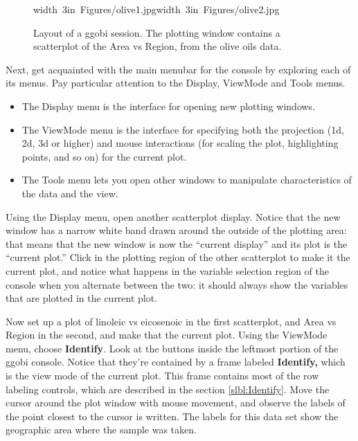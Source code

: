 \documentclass[11pt]{article}
\begin{document}
\begin{figure}[h]
\hbox{\pdfimage width 3in {Figures/olive1.jpg}\pdfimage width 3in {Figures/olive2.jpg}}
\caption{Layout of a ggobi session.  The plotting window contains a
scatterplot of the Area vs Region, from the olive oils data.
}%
\label{fig1}
\end{figure}

Next, get acquainted with the main menubar for the console by
exploring each of its menus.  Pay particular attention to the
Display, ViewMode and Tools menus.

\begin {itemize}
\item The Display menu is the interface for opening new plotting
  windows.
\item The ViewMode menu is the interface for specifying both the
  projection (1d, 2d, 3d or higher) and mouse interactions (for scaling
  the plot, highlighting points, and so on) for the current plot.
\item The Tools menu lets you open other windows to manipulate
  characteristics of the data and the view.
\end {itemize}

Using the Display menu, open another scatterplot display. Notice that
the new window has a narrow white band drawn around the outside of
the plotting area:  that means that the new window is now the
``current display'' and its plot is the ``current plot.''  Click in the
plotting region of the other scatterplot to make it the current plot,
and notice what happens in the variable selection region of the
console when you alternate between the two:  it should always show
the variables that are plotted in the current plot.

Now set up a plot of linoleic vs eicosenoic in the first scatterplot,
and Area vs Region in the second, and make that the current plot.
Using the ViewMode menu, choose {\bf Identify}. Look at the buttons
inside the leftmost portion of the ggobi console. Notice that
they're contained by a frame labeled {\bf Identify,} which is the
view mode of the current plot.  This frame contains most of the row
labeling controls, which are described in the section
\ref{slbl:Identify}. Move the cursor around the plot window with mouse
movement, and observe the labels of the point closest to the cursor is
written. The labels for this data set show the geographic area
where the sample was taken.
\end{document}
